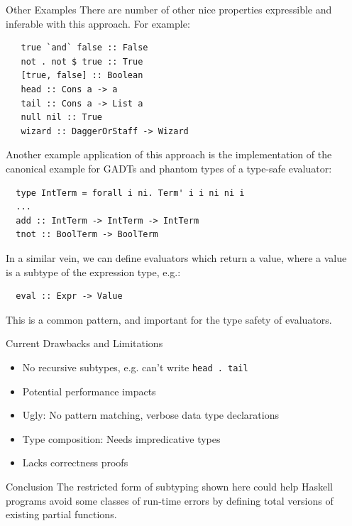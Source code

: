 \documentclass[final]{beamer}
\begin{document}
\begin{frame}[fragile]
\begin{columns}[t]
\begin{column}{.33\textwidth}
\end{column}

\begin{column}{.285\textwidth}
\begin{block}{Other Examples}
\vspace{0.5cm}
There are number of other nice properties expressible and inferable with this
approach. For example:

\begin{verbatim}
   true `and` false :: False
   not . not $ true :: True
   [true, false] :: Boolean
   head :: Cons a -> a
   tail :: Cons a -> List a
   null nil :: True
   wizard :: DaggerOrStaff -> Wizard
\end{verbatim}

Another example application of this approach is the implementation of the
canonical example for GADTs and phantom types of a type-safe evaluator:

\begin{verbatim}
  type IntTerm = forall i ni. Term' i i ni ni i
  ...
  add :: IntTerm -> IntTerm -> IntTerm
  tnot :: BoolTerm -> BoolTerm 
\end{verbatim}

In a similar vein, we can define evaluators which return a value, where a value
is a subtype of the expression type, e.g.:

\begin{verbatim}
  eval :: Expr -> Value
\end{verbatim}

This is a common pattern, and important for the type safety of evaluators. 

\end{block}
\vspace{2cm}
\begin{block}{Current Drawbacks and Limitations}
\vspace{0.5cm}
\begin{itemize}
\item No recursive subtypes, e.g. can't write \verb!head . tail!
\item Potential performance impacts
\item Ugly: No pattern matching, verbose data type declarations 
\item Type composition: Needs impredicative types
\item Lacks correctness proofs
\end{itemize}
\vspace{2cm}
\end{block}

\begin{block}{Conclusion}
\vspace{0.5cm}
The restricted form of subtyping shown here could help Haskell programs avoid
some classes of run-time errors by defining total versions of existing partial
functions. 
\end{block}
\end{column}
\end{columns}
\end{frame}
\end{document}
